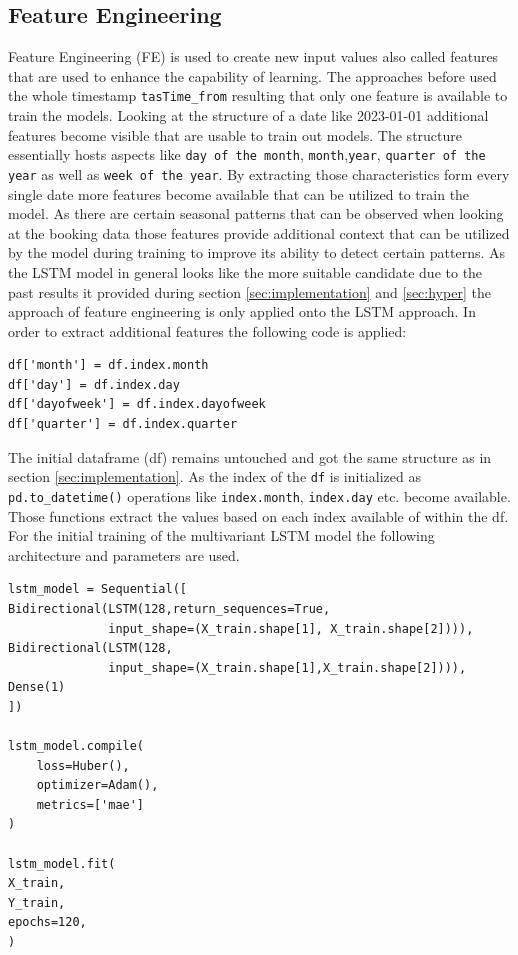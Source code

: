 \subsection{Feature Engineering}
\label{sec:feature_eng}
Feature Engineering (FE) is used to create new input values also called features that are used to enhance the capability of learning. \cite{feature_eng_2} The approaches before used the whole timestamp \verb|tasTime_from| resulting that only one feature is available to train the models.  
Looking at the structure of a date like 2023-01-01 additional features become visible  that are usable to train out models.  The structure essentially hosts aspects like \verb|day of the month|, \verb|month|,\verb|year|, \verb|quarter of the year| as well as \verb|week of the year|. By extracting those characteristics form every single date more features become available that can be utilized to train the model. As there are certain seasonal patterns that can be observed when looking at the booking data those features provide additional context that can be utilized by the model during training to improve its ability to detect certain patterns. As the LSTM model in general looks like the more suitable candidate due to the past results it provided during section \ref{sec:implementation} and \ref{sec:hyper} the approach of feature engineering is only applied onto the LSTM approach.
\newline
In order to extract additional features the following code is applied: 
\begin{lstlisting}
df['month'] = df.index.month
df['day'] = df.index.day
df['dayofweek'] = df.index.dayofweek
df['quarter'] = df.index.quarter
\end{lstlisting}
The initial dataframe (df) remains untouched and got the same structure as in section \ref{sec:implementation}. As the index of the \verb|df| is initialized as \verb|pd.to_datetime()| operations like \verb|index.month|, \verb|index.day| etc. become available. Those functions extract the values based on each index available of within the df. 
For the initial training of the multivariant LSTM model the following architecture and parameters are used. 
\begin{lstlisting}
lstm_model = Sequential([
Bidirectional(LSTM(128,return_sequences=True,
			  input_shape=(X_train.shape[1], X_train.shape[2]))),
Bidirectional(LSTM(128,
			  input_shape=(X_train.shape[1],X_train.shape[2]))),
Dense(1)
])

lstm_model.compile(
    loss=Huber(),
    optimizer=Adam(),
    metrics=['mae']
)

lstm_model.fit(
X_train, 
Y_train, 
epochs=120, 
)
\end{lstlisting}
